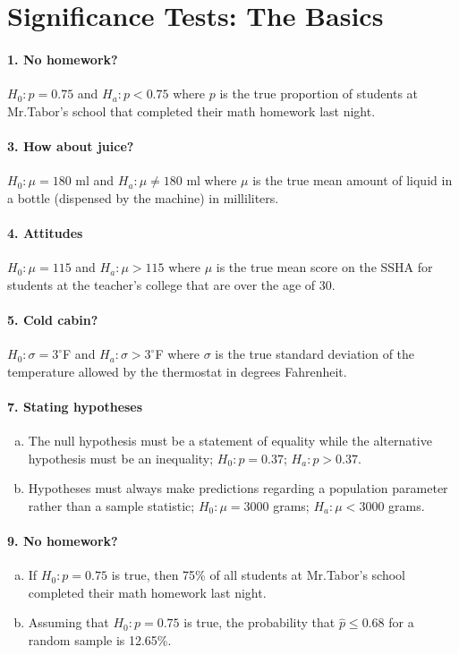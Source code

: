 
	\section{Significance Tests: The Basics}
		\paragraph{1. No homework?}
			$H_0:p = 0.75$ and $H_a:p <  0.75$ where $p$ is the true proportion of students at Mr.Tabor's school that completed their math homework last night.
		\paragraph{3. How about juice?}
			$H_0:\mu = 180$ ml and $H_a:\mu\ne 180$ ml where $\mu$ is the true mean amount of liquid in a bottle (dispensed by the machine) in milliliters.
		\paragraph{4. Attitudes}
			$H_0:\mu = 115$ and $H_a:\mu > 115$ where $\mu$ is the true mean score on the SSHA for students at the teacher's college that are over the age of 30.
		\paragraph{5. Cold cabin?}
			$H_0:\sigma = 3^\circ$F and $H_a:\sigma > 3^\circ$F where $\sigma$ is the true standard deviation of the temperature allowed by the thermostat in degrees Fahrenheit.
		\paragraph{7. Stating hypotheses}
			\begin{enumerate}[a.]
				\item
					The null hypothesis must be a statement of equality while the alternative hypothesis must be an inequality; $H_0:p = 0.37$; $H_a:p > 0.37$.
				\item
					Hypotheses must always make predictions regarding a population parameter rather than a sample statistic; $H_0:\mu = 3000$ grams; $H_a:\mu < 3000$ grams.		
			\end{enumerate}
		\paragraph{9. No homework?}
			\begin{enumerate}[a.]
				\item
					If $H_0:p = 0.75$ is true, then 75\% of all students at Mr.Tabor's school completed their math homework last night.
				\item
					Assuming that $H_0:p = 0.75$ is true, the probability that $\hat{p} \le 0.68$ for a random sample is 12.65\%.
			\end{enumerate}
